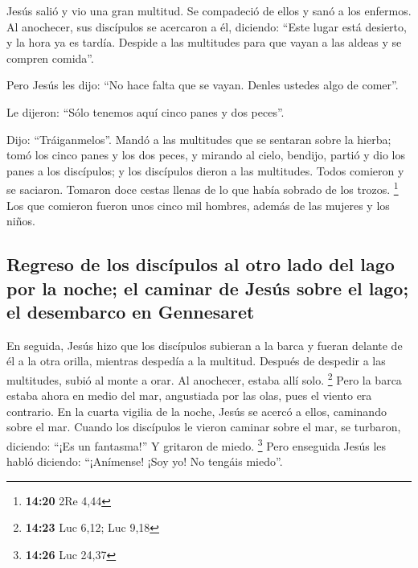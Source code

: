 \begin{paracol}{2}
 Jesús salió y vio una gran multitud. Se compadeció de
ellos y sanó a los enfermos.  Al anochecer, sus
discípulos se acercaron a él, diciendo: ``Este lugar está desierto, y la
hora ya es tardía. Despide a las multitudes para que vayan a las aldeas
y se compren comida''.

 Pero Jesús les dijo: ``No hace falta que se vayan.
Denles ustedes algo de comer''.

 Le dijeron: ``Sólo tenemos aquí cinco panes y dos
peces''.

 Dijo: ``Tráiganmelos''.  Mandó a las
multitudes que se sentaran sobre la hierba; tomó los cinco panes y los
dos peces, y mirando al cielo, bendijo, partió y dio los panes a los
discípulos; y los discípulos dieron a las multitudes. 
Todos comieron y se saciaron. Tomaron doce cestas llenas de lo que había
sobrado de los trozos. \footnote{\textbf{14:20} 2Re 4,44}
 Los que comieron fueron unos cinco mil hombres, además
de las mujeres y los niños.

\hypertarget{regreso-de-los-discuxedpulos-al-otro-lado-del-lago-por-la-noche-el-caminar-de-jesuxfas-sobre-el-lago-el-desembarco-en-gennesaret}{%
\subsection{Regreso de los discípulos al otro lado del lago por la
noche; el caminar de Jesús sobre el lago; el desembarco en
Gennesaret}\label{regreso-de-los-discuxedpulos-al-otro-lado-del-lago-por-la-noche-el-caminar-de-jesuxfas-sobre-el-lago-el-desembarco-en-gennesaret}}

 En seguida, Jesús hizo que los discípulos subieran a la
barca y fueran delante de él a la otra orilla, mientras despedía a la
multitud.  Después de despedir a las multitudes, subió al
monte a orar. Al anochecer, estaba allí solo. \footnote{\textbf{14:23}
  Luc 6,12; Luc 9,18}  Pero la barca estaba ahora en
medio del mar, angustiada por las olas, pues el viento era contrario.
 En la cuarta vigilia de la noche, Jesús se acercó a
ellos, caminando sobre el mar.  Cuando los discípulos le
vieron caminar sobre el mar, se turbaron, diciendo: ``¡Es un fantasma!''
Y gritaron de miedo. \footnote{\textbf{14:26} Luc 24,37} 
Pero enseguida Jesús les habló diciendo: ``¡Anímense! ¡Soy yo! No
tengáis miedo''.


\end{paracol}
